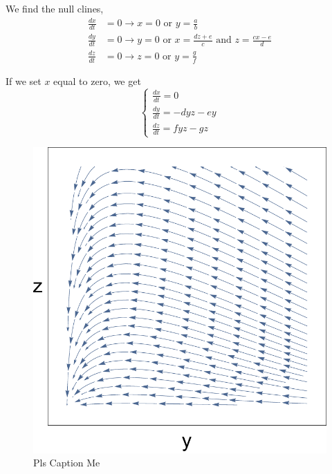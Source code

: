 \documentclass[11pt,oneside]{article}
\begin{document}
	We find the null clines,
	\begin{align}
	\frac{dx}{dt} &= 0 \rightarrow x = 0 \text{ or } y = \frac{a}{b}\\
	\frac{dy}{dt} &= 0 \rightarrow y=0 \text{ or } x = \frac{dz + e}{c} \text{ and } z = \frac{cx - e}{d}\\
	\frac{dz}{dt} &= 0 \rightarrow z = 0 \text{ or } y = \frac{g}{f}
	\end{align}
	
	If we set $x$ equal to zero, we get 
	\begin{equation}
	\begin{cases}
	\frac{dx}{dt} = 0\\
	\frac{dy}{dt} = -dyz - ey\\
	\frac{dz}{dt} = fyz - gz
	\end{cases}
	\end{equation}
	\begin{figure}[H]
		\center
		\includegraphics[scale=0.5]{YZ}
		\caption{Pls Caption Me}
	\end{figure}
	
\end{document}
